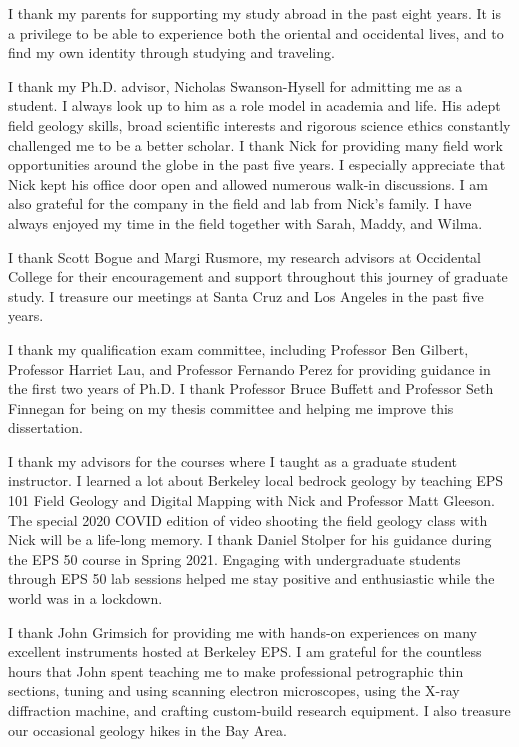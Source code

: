 \documentclass{ucbthesis}
\begin{document}
\begin{frontmatter}
\begin{acknowledgements}
I thank my parents for supporting my study abroad in the past eight years. It is a privilege to be able to experience both the oriental and occidental lives, and to find my own identity through studying and traveling.

I thank my Ph.D. advisor, Nicholas Swanson-Hysell for admitting me as a student. I always look up to him as a role model in academia and life. His adept field geology skills, broad scientific interests and rigorous science ethics constantly challenged me to be a better scholar. I thank Nick for providing many field work opportunities around the globe in the past five years. I especially appreciate that Nick kept his office door open and allowed numerous walk-in discussions. I am also grateful for the company in the field and lab from Nick's family. I have always enjoyed my time in the field together with Sarah, Maddy, and Wilma. 

I thank Scott Bogue and Margi Rusmore, my research advisors at Occidental College for their encouragement and support throughout this journey of graduate study. I treasure our meetings at Santa Cruz and Los Angeles in the past five years. 

I thank my qualification exam committee, including Professor Ben Gilbert, Professor Harriet Lau, and Professor Fernando Perez for providing guidance in the first two years of Ph.D. I thank Professor Bruce Buffett and Professor Seth Finnegan for being on my thesis committee and helping me improve this dissertation. 

I thank my advisors for the courses where I taught as a graduate student instructor. I learned a lot about Berkeley local bedrock geology by teaching EPS 101 Field Geology and Digital Mapping with Nick and Professor Matt Gleeson. The special 2020 COVID edition of video shooting the field geology class with Nick will be a life-long memory. I thank Daniel Stolper for his guidance during the EPS 50 course in Spring 2021. Engaging with undergraduate students through EPS 50 lab sessions helped me stay positive and enthusiastic while the world was in a lockdown. 

I thank John Grimsich for providing me with hands-on experiences on many excellent instruments hosted at Berkeley EPS. I am grateful for the countless hours that John spent teaching me to make professional petrographic thin sections, tuning and using scanning electron microscopes, using the X-ray diffraction machine, and crafting custom-build research equipment. I also treasure our occasional geology hikes in the Bay Area.  


\end{acknowledgements}
\end{frontmatter}
\end{document}
